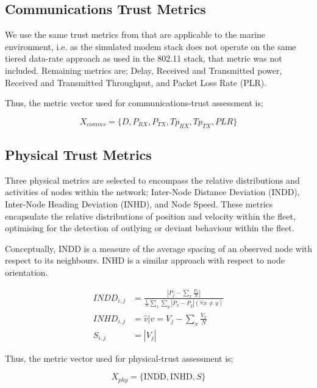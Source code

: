 \subsection{Communications Trust Metrics}

We use the same trust metrics from \cite{Guo2012} that are applicable to the marine environment, i.e. as the simulated modem stack does not operate on the same tiered data-rate approach as used in the 802.11 stack, that metric was not included. Remaining metrics are; Delay, Received and Transmitted power, Received and Transmitted Throughput, and Packet Loss Rate (PLR).

Thus, the metric vector used for communications-trust assessment is;

\begin{equation}
	X_{comms}=\{D, P_{RX}, P_{TX}, Tp_{RX}, Tp_{TX}, PLR\}
	\label{eq:comms_vector}
\end{equation}

\subsection{Physical Trust Metrics}

Three physical metrics are selected to encompass the relative distributions and activities of nodes within the network; Inter-Node Distance Deviation (INDD), Inter-Node Heading Deviation (INHD), and Node Speed. These metrics encapsulate the relative distributions of position and velocity within the fleet, optimising for the detection of outlying or deviant behaviour within the fleet.

Conceptually, INDD is a measure of the average spacing of an observed node with respect to its neighbours. INHD is a similar approach with respect to node orientation.

\begin{align}
	INDD_{i,j} &= \frac{|P_j - \sum_x \frac{P_x}{N}|}{\frac{1}{N}\sum_x \sum_y{|P_x - P_y| (\forall x \neq y)}}\\
	INHD_{i,j} &= \hat{v} \vert v= V_j - \sum_x{\frac{V_x}{N}}\\
	S_{i,j} &= |V_j|
\end{align}

Thus, the metric vector used for physical-trust assessment is;

\begin{equation}
  X_{phy}=\{\text{INDD}, \text{INHD}, S\}
	\label{eq:phys:vector}
\end{equation}


